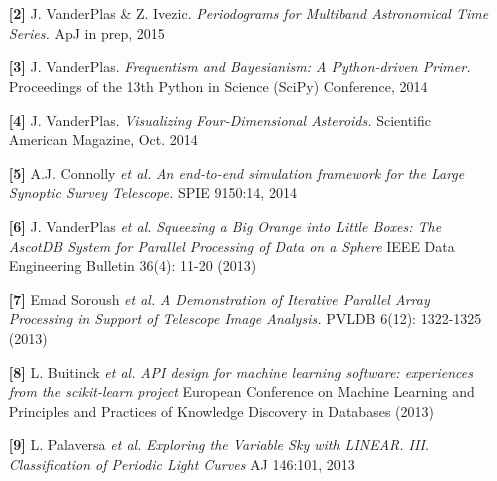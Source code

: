\documentclass{article} %
\def\bf{\bfseries}
\def\sf{\sffamily}
\def\sl{\slshape}
\newlength\sidebarwidth
\newcommand{\subtopic}[3][]
	 {\begin{minipage}{\textwidth}
	 \vspace*{.4\baselineskip}
         \nopagebreak\hspace{0in}%
         \nopagebreak\begin{minipage}[t]{\sidebarwidth - .2cm}
         \raggedleft {\sf\fontseries{sbc}\selectfont #2}
         {\\[-0.2\baselineskip] \textcolor{gray}{\footnotesize #1}}
	 \end{minipage}%
	 \hfill
	 \begin{minipage}[t]{\linewidth - \sidebarwidth}
	 #3%
	 \end{minipage}%
	 \vspace*{.2\baselineskip plus 1\baselineskip minus
	 .2\baselineskip}%
	 \end{minipage}}
\begin{document}
\subtopic{\hspace*{-3ex} Articles}{~ 
  \begin{itemize}[leftmargin=0ex, itemsep=0ex, parsep=.5ex, labelindent=-4ex]

    \item[{\bf \textcolor{myblue}{[2]}}]
      J. VanderPlas \& Z. Ivezic.
      {\it Periodograms for Multiband Astronomical Time Series.}
      ApJ in prep, 2015

    \item[{\bf \textcolor{myblue}{[3]}}]
      J. VanderPlas.
      {\it Frequentism and Bayesianism: A Python-driven Primer.}
      Proceedings of the 13th Python in Science (SciPy) Conference, 2014

    \item[{\bf \textcolor{myblue}{[4]}}]
      J. VanderPlas.
      {\it Visualizing Four-Dimensional Asteroids.}
      Scientific American Magazine, Oct. 2014

    \item[{\bf \textcolor{myblue}{[5]}}]
      A.J. Connolly {\it et al.}
      {\it An end-to-end simulation framework for the Large Synoptic Survey Telescope.}
      SPIE 9150:14, 2014

    \item[{\bf \textcolor{myblue}{[6]}}]
      J. VanderPlas {\it et al.}
      {\it Squeezing a Big Orange into Little Boxes: The AscotDB System
        for Parallel Processing of Data on a Sphere}
      IEEE Data Engineering Bulletin 36(4): 11-20 (2013)

    \item[{\bf \textcolor{myblue}{[7]}}]
      Emad Soroush {\it et al.}
      {\it A Demonstration of Iterative Parallel Array Processing in Support
        of Telescope Image Analysis.}
      PVLDB 6(12): 1322-1325 (2013)

    \item[{\bf \textcolor{myblue}{[8]}}]
      L. Buitinck {\it et al.}
      {\it API design for machine learning software:
        experiences from the scikit-learn project}
      European Conference on Machine Learning and Principles and Practices
      of Knowledge Discovery in Databases (2013)

    \item[{\bf \textcolor{myblue}{[9]}}]
      L. Palaversa {\sl et al.}
      {\sl Exploring the Variable Sky with LINEAR. III.
        Classification of Periodic Light Curves}
      AJ 146:101, 2013


\end{itemize}}
\end{document}
